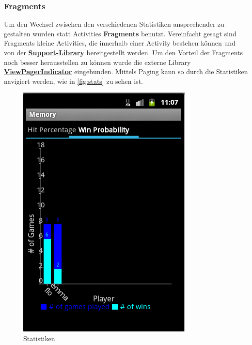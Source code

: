 \documentclass[11pt,a4paper]{article}
\begin{document}
\subsubsection{Fragments}
Um den Wechsel zwischen den verschiedenen Statistiken ansprechender zu gestalten wurden statt Activities \textbf{Fragments} benutzt. Vereinfacht gesagt sind Fragments kleine Activities, die innerhalb einer Activity bestehen können und von der \textbf{\href{http://developer.android.com/tools/extras/support-library.html}{Support-Library}} bereitgestellt werden.
Um den Vorteil der Fragments noch besser herausstellen zu können wurde die externe Library \textbf{\href{http://viewpagerindicator.com/}{ViewPagerIndicator}} eingebunden. Mittels Paging  kann so durch die Statistiken navigiert werden, wie in \autoref{fig:stats} zu sehen ist.
\begin{figure}[!h]
\centering
\includegraphics[scale=0.7]{pics/stats.png}
\caption{Statistiken}
\label{fig:stats}
\end{figure}
\end{document}
